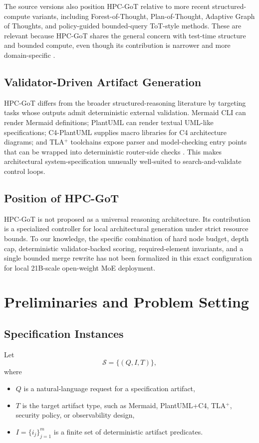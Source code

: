 \documentclass[11pt,a4paper]{article}
\numberwithin{equation}{section}
\theoremstyle{definition}
\newcommand{\Instance}{\mathcal{S}}
\begin{document}
The source versions also position HPC-GoT relative to more recent structured-compute variants, including Forest-of-Thought, Plan-of-Thought, Adaptive Graph of Thoughts, and policy-guided bounded-query ToT-style methods. These are relevant because HPC-GoT shares the general concern with test-time structure and bounded compute, even though its contribution is narrower and more domain-specific \cite{forest,plan,adaptivegot,policytot}.

\subsection{Validator-Driven Artifact Generation}

HPC-GoT differs from the broader structured-reasoning literature by targeting tasks whose outputs admit deterministic external validation. Mermaid CLI can render Mermaid definitions; PlantUML can render textual UML-like specifications; C4-PlantUML supplies macro libraries for C4 architecture diagrams; and TLA\(^+\) toolchains expose parser and model-checking entry points that can be wrapped into deterministic router-side checks \cite{mermaidcli,plantuml,C4PlantUML,tlaplusrepo,tlaplusdocs}. This makes architectural system-specification unusually well-suited to search-and-validate control loops.

\subsection{Position of HPC-GoT}

HPC-GoT is not proposed as a universal reasoning architecture. Its contribution is a specialized controller for local architectural generation under strict resource bounds. To our knowledge, the specific combination of hard node budget, depth cap, deterministic validator-backed scoring, required-element invariants, and a single bounded merge rewrite has not been formalized in this exact configuration for local 21B-scale open-weight MoE deployment.

\section{Preliminaries and Problem Setting}

\subsection{Specification Instances}

Let
\[
\Instance = \{(Q,I,T)\},
\]
where
\begin{itemize}[leftmargin=2em]
    \item \(Q\) is a natural-language request for a specification artifact,
    \item \(T\) is the target artifact type, such as Mermaid, PlantUML+C4, TLA\(^+\), security policy, or observability design,
    \item \(I=\{i_j\}_{j=1}^{m}\) is a finite set of deterministic artifact predicates.
\end{itemize}
\end{document}
